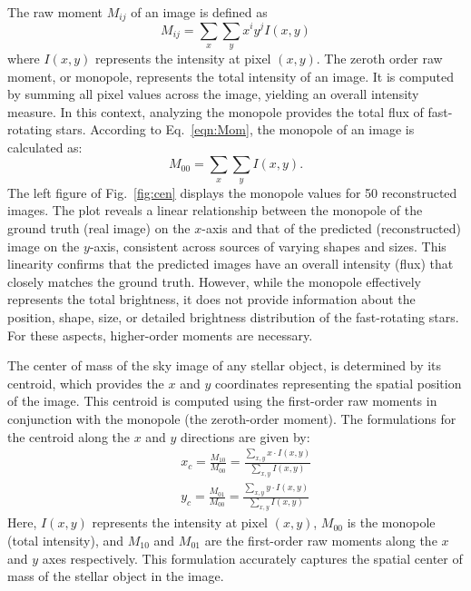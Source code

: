 The raw moment $M_{ij}$ of an image is defined as \citep{hu1962visual}
\begin{equation}
	M_{ij} = \sum_{x} \sum_{y} x^i y^j I(x, y)
	\label{eqn:Mom}
\end{equation}
where $I(x,y)$ represents the intensity at pixel $(x,y)$. The zeroth order raw moment, or monopole, represents the total intensity of an image. It is computed by summing all pixel values across the image, yielding an overall intensity measure. In this context, analyzing the monopole provides the total flux of fast-rotating stars. According to Eq.~\eqref{eqn:Mom}, the monopole of an image is calculated as:
\begin{equation}
	M_{00} = \sum_{x} \sum_{y} I(x, y).
\end{equation}
The left figure of Fig.~\ref{fig:cen} displays the monopole values for 50 reconstructed images. The plot reveals a linear relationship between the monopole of the ground truth (real image) on the $x$-axis and that of the predicted (reconstructed) image on the $y$-axis, consistent across sources of varying shapes and sizes. This linearity confirms that the predicted images have an overall intensity (flux) that closely matches the ground truth. However, while the monopole effectively represents the total brightness, it does not provide information about the position, shape, size, or detailed brightness distribution of the fast-rotating stars. For these aspects, higher-order moments are necessary.

The center of mass of the sky image of any stellar object, is determined by its centroid, which provides the $x$ and $y$ coordinates representing the spatial position of the image. This centroid is computed using the first-order raw moments in conjunction with the monopole (the zeroth-order moment). The formulations for the centroid along the $x$ and $y$ directions are given by:
\begin{eqnarray}
&&x_c = \frac{M_{10}}{M_{00}} = \frac{\sum_{x,y} x \cdot I(x,y)}{\sum_{x,y} I(x,y)} \nonumber \\
&&y_c = \frac{M_{01}}{M_{00}} = \frac{\sum_{x,y} y \cdot I(x,y)}{\sum_{x,y} I(x,y)}
\end{eqnarray}
Here, \(I(x,y)\) represents the intensity at pixel \((x,y)\), \(M_{00}\) is the monopole (total intensity), and \(M_{10}\) and \(M_{01}\) are the first-order raw moments along the $x$ and $y$ axes respectively. This formulation accurately captures the spatial center of mass of the stellar object in the image.

